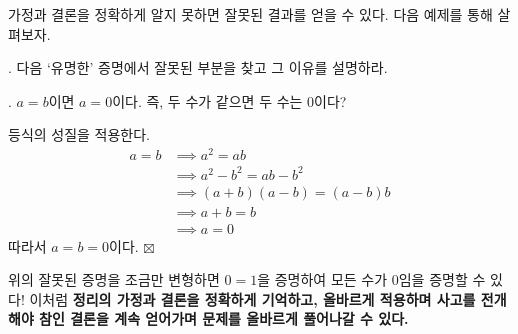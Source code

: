 가정과 결론을 정확하게 알지 못하면 잘못된 결과를 얻을 수 있다. 다음 예제를 통해 살펴보자.

\newpage

\ex. 다음 `유명한' 증명에서 잘못된 부분을 찾고 그 이유를 설명하라.

\bigskip

\thm. \(a = b\)이면 \(a = 0\)이다. 즉, 두 수가 같으면 두 수는 0이다?

\pf 등식의 성질을 적용한다.
\[
    \begin{aligned}
        a = b & \implies a^2 = ab \\
              & \implies a^2 - b^2 = ab - b^2 \\
              & \implies (a + b)(a - b) = (a - b)b \\
              & \implies a + b = b \\
              & \implies a = 0
    \end{aligned}
\]
따라서 \(a = b = 0\)이다. \hfill \(\boxtimes\)

\bigskip

위의 잘못된 증명을 조금만 변형하면 \(0 = 1\)을 증명하여 모든 수가 0임을 증명할 수 있다! 이처럼 \textbf{정리의 가정과 결론을 정확하게 기억하고, 올바르게 적용하며 사고를 전개해야 참인 결론을 계속 얻어가며 문제를 올바르게 풀어나갈 수 있다.}
